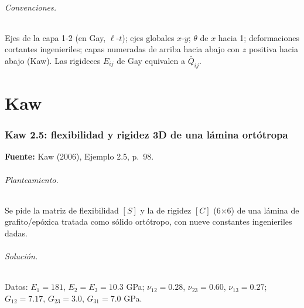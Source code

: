 \documentclass[11pt]{article}
\begin{document}
\paragraph{Convenciones.} Ejes de la capa 1-2 (en Gay, $\ell$-$t$); ejes globales $x$-$y$; $\theta$ de $x$ hacia 1; deformaciones cortantes ingenieriles; capas numeradas de arriba hacia abajo con $z$ positiva hacia abajo (Kaw). Las rigideces $E_{ij}$ de Gay equivalen a $\bar Q_{ij}$.
\tableofcontents\clearpage
\part*{Kaw}
\section{Kaw 2.5: flexibilidad y rigidez 3D de una lámina ortótropa}\label{ej:kaw_2_5}
\textbf{Fuente:} Kaw (2006), Ejemplo 2.5, p.~98.

\paragraph{Planteamiento.} Se pide la matriz de flexibilidad $[S]$ y la de rigidez $[C]$ (6$\times$6) de una lámina de grafito/epóxica tratada como sólido ortótropo, con nueve constantes ingenieriles dadas.

\paragraph{Solución.}
Datos: $E_1=181$, $E_2=E_3=10.3$ GPa; $\nu_{12}=0.28$, $\nu_{23}=0.60$, $\nu_{13}=0.27$; $G_{12}=7.17$, $G_{23}=3.0$, $G_{31}=7.0$ GPa.
\end{document}
